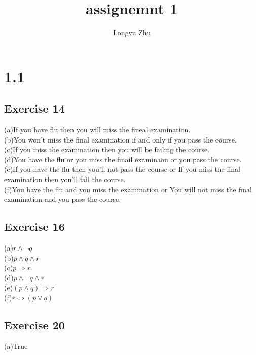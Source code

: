\documentclass[12pt]{article}
\title{assignemnt 1}
\author{Longyu Zhu}
\begin{document}
\section*{1.1}

\subsection*{Exercise 14}

(a)If you have flu then you will miss the fineal examination.\\

(b)You won't miss the final examination if and only if you pass the course.\\

(c)If you miss the examination then you will be failing the course.\\

(d)You have the flu or you miss the finail examinaon or you pass the course.\\

(e)If you have the flu then you'll not pass the course or If you miss the final examination then you'll fail the course.\\

(f)You have the flu and you miss the examination or You will not miss the final examination and you pass the course.\\

\subsection*{Exercise 16}

(a)$r\land \neg q$\\

(b)$p\land q\land r$ \\

(c)$p\Rightarrow r$\\

(d)$p\land \neg q\land r$\\

(e)$(p\land q)\Rightarrow r$\\

(f)$r\Leftrightarrow (p\lor q)$\\


\subsection*{Exercise 20}

(a)True\\
\end{document}
